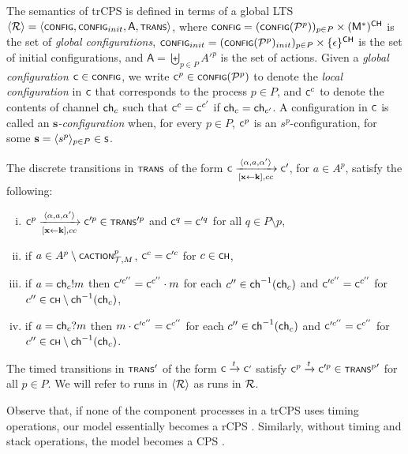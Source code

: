 \sloppy The semantics of trCPS is defined in terms of a global LTS $\tup{\cal R} = \tup{\scrsf{config}, \scrsf{config}_{init}, \mathsf{A}, \trans}$, where $\scrsf{config} = (\config{\cal P^p})_{p \in P} \times (\mathsf M^*)^{\scrsf{ch}}$ is the set of \emph{global configurations}, $\scrsf{config}_{init} = (\config{\cal P^p}_{init})_{p \in P} \times \{\epsilon\}^{\scrsf{ch}}$ is the set of initial configurations, and $\mathsf{A} = \biguplus_{p \in P} {A'^p}$ is the set of actions. Given a \emph{global configuration} $\scrsf{c} \in \scrsf{config}$, we write $\scrsf{c}^p \in \config{\cal P^p}$ to denote the \emph{local configuration} in $\scrsf{c}$ that corresponds to the process $p \in P$, and $\scrsf{c}^{c}$ to denote the contents of channel $\ch_c$ such that $\scrsf{c}^c = \scrsf{c}^{c'}$ if $\ch_c = \ch_{c'}$. A configuration in $\scrsf{c}$ is called an $\mathbf{s}$\emph{-configuration} when, for every $p \in P$, $\scrsf{c}^p$ is an $s^p$-configuration, for some $\mathbf{s} =\tup{s^p}_{p\in P} \in \scrsf{s}$.

The discrete transitions in $\trans$ of the form $\scrsf{c} \xrightarrow[{[\mathbf{x} \leftarrow \mathbf{k}]}, cc]{\tup{\alpha,a,\alpha'}} \scrsf{c}'$, for $a\in A^p$, satisfy the following:
\begin{enumerate}[(i)]
	\item $\scrsf{c}^p \xrightarrow[{[\mathbf{x} \leftarrow \mathbf{k}]}, cc]{\tup{\alpha,a,\alpha'}} \scrsf{c}'^p \in \trans'^p$ and $\scrsf{c}^q = \scrsf{c}'^q$ for all $q\in P \setminus p$,
	\item if $a \in A^p\setminus\scrsf{caction}^p_{\cal T, M}$, $\scrsf{c}^c = \scrsf{c}'^c$ for $c \in \scrsf{ch}$,
	\item if $a = \ch_c!m$ then $\scrsf{c}'^{c''} = \scrsf{c}^{c''}\cdot m$ for each $c'' \in \ch^{-1}(\ch_c)$ and $\scrsf{c}'^{c''} = \scrsf{c}^{c''}$ for $c'' \in \scrsf{ch}\setminus\ch^{-1}(\ch_c)$,
	\item if $a = \ch_c?m$ then $m\cdot\scrsf{c}'^{c''} = \scrsf{c}^{c''}$ for each $c'' \in \ch^{-1}(\ch_c)$ and $\scrsf{c}'^{c''} = \scrsf{c}^{c''}$ for $c'' \in \scrsf{ch}\setminus\ch^{-1}(\ch_c)$.
\end{enumerate}
The timed transitions in $\trans'$ of the form $\scrsf{c} \xrightarrow{t} \scrsf{c'}$ satisfy $\scrsf{c}^p \xrightarrow{t} \scrsf{c}'^p \in {\trans^p}'$ for all $p \in P$. We will refer to runs in $\tup{\cal R}$ as runs in $\cal R$.


Observe that, if none of the component processes in a trCPS uses timing operations, our model essentially becomes a rCPS \cite[Def. 1.7]{heussner2012reachability}. Similarly, without timing and stack operations, the model becomes a CPS \cite[Def. 1.2]{heussner2012reachability}. 

